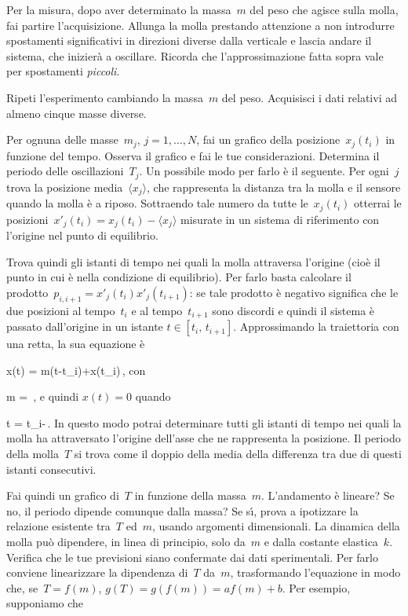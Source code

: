 \documentclass[12pt, a4paper]{physathome}   	%
\begin{document}
Per la misura, dopo aver determinato la massa~$m$ del peso che agisce sulla molla, fai partire l'acquisizione. Allunga la molla prestando attenzione a non introdurre spostamenti significativi in direzioni diverse dalla verticale e lascia andare il sistema, che inizier\`a a oscillare. Ricorda che l'approssimazione fatta sopra vale per spostamenti {\em piccoli}.

Ripeti l'esperimento cambiando la massa~$m$ del peso. Acquisisci i dati relativi ad almeno cinque masse diverse. 

Per ognuna delle masse~$m_j$, $j=1,\ldots,N$, fai un grafico della posizione~$x_j(t_i)$ in funzione del tempo. Osserva il grafico e fai le tue considerazioni. Determina il periodo delle oscillazioni~$T_j$. Un possibile modo per farlo \`e il seguente. Per ogni~$j$ trova la posizione media~$\langle x_j\rangle$, che rappresenta la distanza tra la molla e il sensore quando la molla \`e a riposo. Sottraendo tale numero da tutte le~$x_j(t_i)$ otterrai le posizioni~$x'_j(t_i)= x_j(t_i)-\langle x_j\rangle$ misurate in un sistema di riferimento con l'origine nel punto di equilibrio.

Trova quindi gli istanti di tempo nei quali la molla attraversa l'origine (cio\`e il punto in cui \`e nella condizione di equilibrio). Per farlo basta calcolare il prodotto~$p_{i,i+1} = x'_j(t_i)x'_j(t_{i+1})$: se tale prodotto \`e negativo significa che le due posizioni al tempo~$t_i$ e al tempo~$t_{i+1}$ sono discordi e quindi il sistema \`e passato dall'origine in un istante $t\in\left[t_i,\,t_{i+1}\right]$. Approssimando la traiettoria con una retta, la sua equazione \`e

\beq
x(t) = m(t-t_i)+x(t_i)\,,
\eeq
con

\beq
m = \,,
\eeq
e quindi $x(t)=0$ quando

\beq
t = t_i-\,.
\eeq
In questo modo potrai determinare tutti gli istanti di tempo nei quali la molla ha attraversato l'origine dell'asse che ne rappresenta la posizione. Il periodo della molla~$T$ si trova come il doppio della media della differenza tra due di questi istanti consecutivi.

Fai quindi un grafico di~$T$ in funzione della massa~$m$. L'andamento \`e lineare? Se no, il periodo dipende comunque dalla massa? Se s\'\i{}, prova a ipotizzare la relazione esistente tra~$T$ ed~$m$, usando argomenti dimensionali. La dinamica della molla pu\`o dipendere, in linea di principio, solo da~$m$ e dalla costante elastica~$k$. Verifica che le tue previsioni siano confermate dai dati sperimentali. Per farlo conviene linearizzare la dipendenza di~$T$ da~$m$, trasformando l'equazione in modo che, se~$T=f(m)$, $g(T)=g(f(m))=af(m)+b$. Per esempio, supponiamo che
\end{document}
